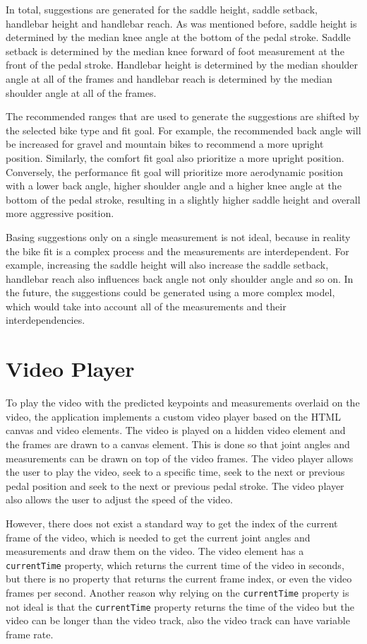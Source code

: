 In total, suggestions are generated for the saddle height, saddle setback, handlebar height and handlebar reach. As was mentioned before, saddle height is determined by the median knee angle at the bottom of the pedal stroke. Saddle setback is determined by the median knee forward of foot measurement at the front of the pedal stroke. Handlebar height is determined by the median shoulder angle at all of the frames and handlebar reach is determined by the median shoulder angle at all of the frames.

The recommended ranges that are used to generate the suggestions are shifted by the selected bike type and fit goal. For example, the recommended back angle will be increased for gravel and mountain bikes to recommend a more upright position. Similarly, the comfort fit goal also prioritize a more upright position. Conversely, the performance fit goal will prioritize more aerodynamic position with a lower back angle, higher shoulder angle and a higher knee angle at the bottom of the pedal stroke, resulting in a slightly higher saddle height and overall more aggressive position.

Basing suggestions only on a single measurement is not ideal, because in reality the bike fit is a complex process and the measurements are interdependent. For example, increasing the saddle height will also increase the saddle setback, handlebar reach also influences back angle not only shoulder angle and so on. In the future, the suggestions could be generated using a more complex model, which would take into account all of the measurements and their interdependencies.
\section{Video Player}
\label{video_player}
To play the video with the predicted keypoints and measurements overlaid on the video, the application implements a custom video player based on the HTML canvas and video elements. The video is played on a hidden video element and the frames are drawn to a canvas element. This is done so that joint angles and measurements can be drawn on top of the video frames. The video player allows the user to play the video, seek to a specific time, seek to the next or previous pedal position and seek to the next or previous pedal stroke. The video player also allows the user to adjust the speed of the video.

However, there does not exist a standard way to get the index of the current frame of the video, which is needed to get the current joint angles and measurements and draw them on the video. The video element has a \texttt{currentTime} property, which returns the current time of the video in seconds, but there is no property that returns the current frame index, or even the video frames per second. Another reason why relying on the \texttt{currentTime} property is not ideal is that the \texttt{currentTime} property returns the time of the video but the video can be longer than the video track, also the video track can have variable frame rate.

